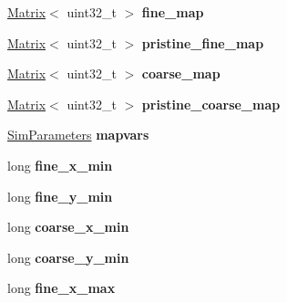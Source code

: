 \begin{DoxyCompactItemize}
\item 
\hyperlink{class_matrix}{Matrix}$<$ uint32\+\_\+t $>$ {\bfseries fine\+\_\+map}\hypertarget{class_map_a4579c0a75f27777739b8f13ec620fa21}{}\label{class_map_a4579c0a75f27777739b8f13ec620fa21}

\item 
\hyperlink{class_matrix}{Matrix}$<$ uint32\+\_\+t $>$ {\bfseries pristine\+\_\+fine\+\_\+map}\hypertarget{class_map_a807b35e2a3822cb98f92cf545cb85cf6}{}\label{class_map_a807b35e2a3822cb98f92cf545cb85cf6}

\item 
\hyperlink{class_matrix}{Matrix}$<$ uint32\+\_\+t $>$ {\bfseries coarse\+\_\+map}\hypertarget{class_map_a67045641f66beb1d3689726cb23fbc29}{}\label{class_map_a67045641f66beb1d3689726cb23fbc29}

\item 
\hyperlink{class_matrix}{Matrix}$<$ uint32\+\_\+t $>$ {\bfseries pristine\+\_\+coarse\+\_\+map}\hypertarget{class_map_a6d2258eb1652f5d411d88a02efaf4862}{}\label{class_map_a6d2258eb1652f5d411d88a02efaf4862}

\item 
\hyperlink{struct_sim_parameters}{Sim\+Parameters} {\bfseries mapvars}\hypertarget{class_map_afc7243e4b89be2a6e7340e8fa84c6679}{}\label{class_map_afc7243e4b89be2a6e7340e8fa84c6679}

\item 
long {\bfseries fine\+\_\+x\+\_\+min}\hypertarget{class_map_ad1a45a6a48740e4ea0f0e02f7370318e}{}\label{class_map_ad1a45a6a48740e4ea0f0e02f7370318e}

\item 
long {\bfseries fine\+\_\+y\+\_\+min}\hypertarget{class_map_adb389e9c031b9f5d2eea869792ed4860}{}\label{class_map_adb389e9c031b9f5d2eea869792ed4860}

\item 
long {\bfseries coarse\+\_\+x\+\_\+min}\hypertarget{class_map_ad7df363b8838c3ba53c1271b6567f446}{}\label{class_map_ad7df363b8838c3ba53c1271b6567f446}

\item 
long {\bfseries coarse\+\_\+y\+\_\+min}\hypertarget{class_map_a5156c05799e2281562e1903fdb256069}{}\label{class_map_a5156c05799e2281562e1903fdb256069}

\item 
long {\bfseries fine\+\_\+x\+\_\+max}\hypertarget{class_map_a9113839ec16bbea73081ed9f8f45bb69}{}\label{class_map_a9113839ec16bbea73081ed9f8f45bb69}


\end{DoxyCompactItemize}
